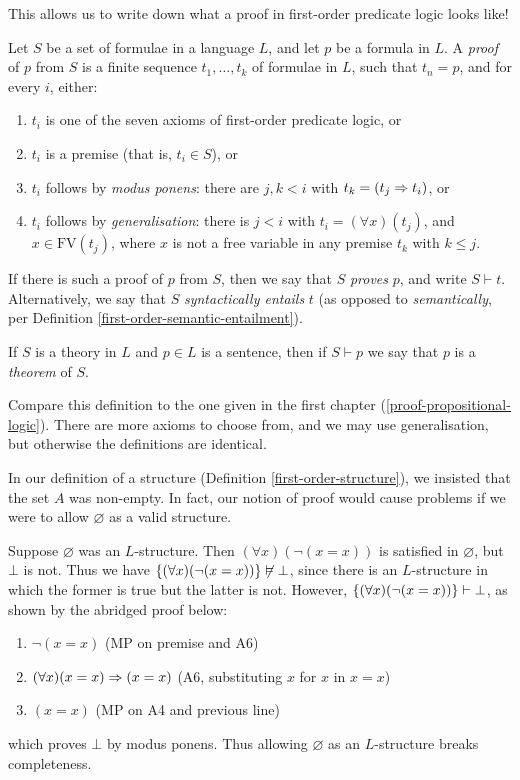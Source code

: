 \documentclass{article}
\begin{document}
This allows us to write down what a proof in first-order predicate logic looks like!

\begin{definition}[Proof]
    Let $S$ be a set of formulae in a language $L$, and let $p$ be a formula in $L$. A \textit{proof} of $p$ from $S$ is a finite sequence $t_1, \dots, t_k$ of formulae in $L$, such that $t_n = p$, and for every $i$, either:
    \begin{enumerate}
	    \item $t_i$ is one of the seven axioms of first-order predicate logic, or
	    \item $t_i$ is a premise (that is, $t_i \in S$), or
	    \item $t_i$ follows by \textit{modus ponens}: there are $j,k < i$ with $t_k = (t_j \Rightarrow t_i)$, or
	    \item $t_i$ follows by \textit{generalisation}: there is $j < i$ with $t_i = (\forall x)(t_j)$, and $x \in \mathrm{FV}(t_j)$, where $x$ is not a free variable in any premise $t_k$ with $k \leq j$.
	\end{enumerate}
	If there is such a proof of $p$ from $S$, then we say that $S$ \textit{proves} $p$, and write $S \vdash t$. Alternatively, we say that $S$ \textit{syntactically entails} $t$ (as opposed to \textit{semantically}, per Definition \ref{first-order-semantic-entailment}).
	
	If $S$ is a theory in $L$ and $p \in L$ is a sentence, then if $S \vdash p$ we say that $p$ is a \textit{theorem} of $S$.
\end{definition}

Compare this definition to the one given in the first chapter (\ref{proof-propositional-logic}). There are more axioms to choose from, and we may use generalisation, but otherwise the definitions are identical.

\begin{remark}
	\label{no-empty-set-simplifying-first-order}
    In our definition of a structure (Definition \ref{first-order-structure}), we insisted that the set $A$ was non-empty. In fact, our notion of proof would cause problems if we were to allow $\varnothing$ as a valid structure.
    
    Suppose $\varnothing$ was an $L$-structure. Then $(\forall x)(\lnot(x=x))$ is satisfied in $\varnothing$, but $\bot$ is not. Thus we have $\left\lbrace (\forall x)(\lnot(x=x)) \right\rbrace \not\vDash \bot$, since there is an $L$-structure in which the former is true but the latter is not. However, $\left\lbrace (\forall x)(\lnot(x=x)) \right\rbrace\vdash \bot$, as shown by the abridged proof below:
    \begin{enumerate}
	    \item $\lnot (x = x)$ \hfill (MP on premise and A6)
	    \item $(\forall x)(x = x) \Rightarrow (x = x)$ \hfill (A6, substituting $x$ for $x$ in  $x=x$)
	    \item $(x = x)$ \hfill (MP on A4 and previous line)
	\end{enumerate}
	which proves $\bot$ by modus ponens. Thus allowing $\varnothing$ as an $L$-structure breaks completeness.
\end{remark}
\end{document}
